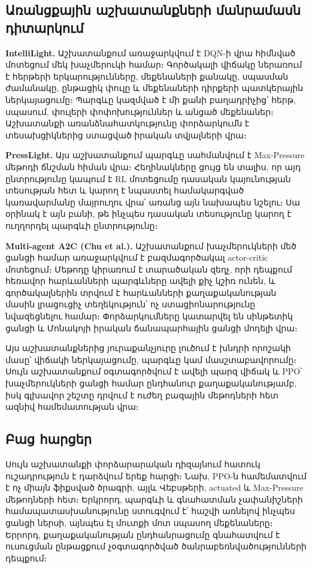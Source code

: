 \documentclass[12pt,a4paper]{extreport}
\begin{document}
\subsection{Առանցքային աշխատանքների մանրամասն դիտարկում}

\textbf{IntelliLight.} Աշխատանքում \cite{intellilight2018} առաջարկվում է DQN-ի վրա հիմնված մոտեցում մեկ խաչմերուկի համար։ Գործակալի վիճակը ներառում է հերթերի երկարությունները, մեքենաների քանակը, սպասման ժամանակը, ընթացիկ փուլը և մեքենաների դիրքերի պատկերային ներկայացումը։ Պարգևը կազմված է մի քանի բաղադրիչից՝ հերթ, սպասում, փուլերի փոփոխություններ և անցած մեքենաներ։ Աշխատանքի առանձնահատկությունը փորձարկումն է տեսախցիկներից ստացված իրական տվյալների վրա։

\textbf{PressLight.} Այս աշխատանքում \cite{presslight2019} պարգևը սահմանվում է Max-Pressure մեթոդի ճնշման հիման վրա։ Հեղինակները ցույց են տալիս, որ այդ ընտրությունը կապում է RL մոտեցումը դասական կայունության տեսության հետ և կարող է նպաստել համակարգված կառավարմանը մայրուղու վրա՝ առանց այն նախապես նշելու։ Սա օրինակ է այն բանի, թե ինչպես դասական տեսությունը կարող է ուղղորդել պարգևի ընտրությունը։

\textbf{Multi-agent A2C (Chu et al.).} Աշխատանքում \cite{chu2020} խաչմերուկների մեծ ցանցի համար առաջարկվում է բազմագործակալ actor-critic մոտեցում։ Մեթոդը կիրառում է տարածական զեղչ, որի դեպքում հեռավոր հարևանների պարգևները ավելի քիչ կշիռ ունեն, և գործակալներին տրվում է հարևանների քաղաքականության մասին լրացուցիչ տեղեկություն՝ ոչ ստացիոնարությունը նվազեցնելու համար։ Փորձարկումները կատարվել են սինթետիկ ցանցի և Մոնակոյի իրական ճանապարհային ցանցի մոդելի վրա։

Այս աշխատանքներից յուրաքանչյուրը լուծում է խնդրի որոշակի մասը՝ վիճակի ներկայացումը, պարգևը կամ մասշտաբավորումը։ Սույն աշխատանքում օգտագործվում է ավելի պարզ վիճակ և PPO՝ խաչմերուկների ցանցի համար ընդհանուր քաղաքականությամբ, իսկ գլխավոր շեշտը դրվում է ուժեղ բազային մեթոդների հետ ազնիվ համեմատության վրա։

\subsection{Բաց հարցեր}

Սույն աշխատանքի փորձարարական դիզայնում հատուկ ուշադրություն է դարձվում երեք հարցի։ Նախ, PPO-ն համեմատվում է ոչ միայն ֆիքսված ծրագրի, այլև Վեբսթերի, actuated և Max-Pressure մեթոդների հետ։ Երկրորդ, պարգևի և գնահատման չափանիշների համապատասխանությունը ստուգվում է՝ հաշվի առնելով ինչպես ցանցի ներսի, այնպես էլ մուտքի մոտ սպասող մեքենաները։ Երրորդ, քաղաքականության ընդհանրացումը գնահատվում է ուսուցման ընթացքում չօգտագործված ծանրաբեռնվածությունների դեպքում։
\end{document}
